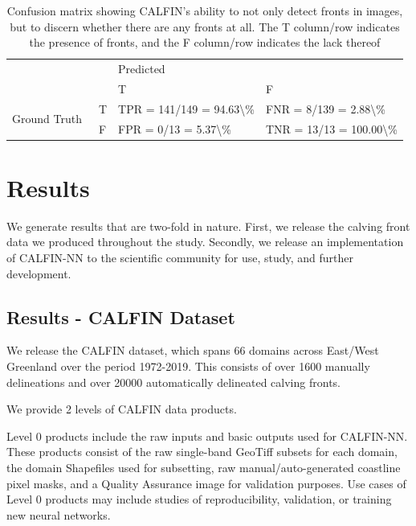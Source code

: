 \documentclass[tc, manuscript]{copernicus}
\begin{document}
\begin{table}[h]
\centering
\caption{Confusion matrix showing CALFIN's ability to not only detect fronts in images, but to discern whether there are any fronts at all. The T column/row indicates the presence of fronts, and the F column/row indicates the lack thereof}
\label{confusion-matrix}
\begin{tabular}{llll}
                               &   & \multicolumn{2}{l}{Predicted}                                                     \\
                               &   & T                                       & F                                       \\
\multirow{2}{*}{Ground Truth~} & T & TPR = 141/149 = 94.63\textbackslash{}\% & FNR = 8/139 = 2.88\textbackslash{}\%    \\
                               & F & FPR = 0/13 = 5.37\textbackslash{}\%     & TNR = 13/13 = 100.00\textbackslash{}\% 
\end{tabular}
\end{table}



\section{Results}
We generate results that are two-fold in nature. First, we release the calving front data we produced throughout the study. Secondly, we release an implementation of CALFIN-NN to the scientific community for use, study, and further development.

\subsection{Results - CALFIN Dataset}
We release the CALFIN dataset, which spans 66 domains across East/West Greenland over the period 1972-2019. This consists of over 1600 manually delineations and over 20000 automatically delineated calving fronts.

We provide 2 levels of CALFIN data products. 

Level 0 products include the raw inputs and basic outputs used for CALFIN-NN. These products consist of the raw single-band GeoTiff subsets for each domain, the domain Shapefiles used for subsetting, raw manual/auto-generated coastline pixel masks, and a Quality Assurance image for validation purposes. Use cases of Level 0 products may include studies of reproducibility, validation, or training new neural networks.
\end{document}

